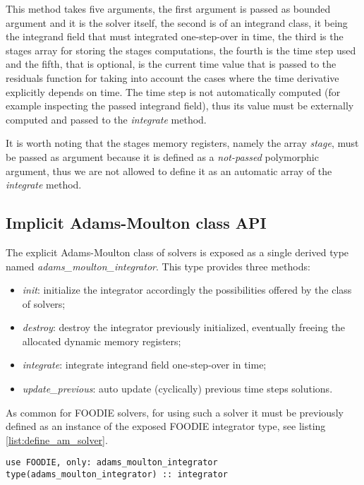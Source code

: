 This method takes five arguments, the first argument is passed as bounded argument and it is the solver itself, the second is of an integrand class, it being the integrand field that must integrated one-step-over in time, the third is the stages array for storing the stages computations, the fourth is the time step used and the fifth, that is optional, is the current time value that is passed to the residuals function for taking into account the cases where the time derivative explicitly depends on time. The time step is not automatically computed (for example inspecting the passed integrand field), thus its value must be externally computed and passed to the \emph{integrate} method.

It is worth noting that the stages memory registers, namely the array \emph{stage}, must be passed as argument because it is defined as a \emph{not-passed} polymorphic argument, thus we are not allowed to define it as an automatic array of the \emph{integrate} method.

\subsection{Implicit Adams-Moulton class API}\label{subsec:solver_am}

The explicit Adams-Moulton class of solvers is exposed as a single derived type named \emph{adams\_moulton\_integrator}. This type provides three methods:

\begin{itemize}
  \item \emph{init}: initialize the integrator accordingly the possibilities offered by the class of solvers;
  \item \emph{destroy}: destroy the integrator previously initialized, eventually freeing the allocated dynamic memory registers;
  \item \emph{integrate}: integrate integrand field one-step-over in time;
  \item \emph{update\_previous}: auto update (cyclically) previous time steps solutions.
  \end{itemize}

As common for FOODIE solvers, for using such a solver it must be previously defined as an instance of the exposed FOODIE integrator type, see listing \ref{list:define_am_solver}.

\begin{lstlisting}[firstnumber=1,style=code,caption={definition of an implicit Adams-Moulton integrator},label={list:define_am_solver}]
use FOODIE, only: adams_moulton_integrator
type(adams_moulton_integrator) :: integrator
\end{lstlisting}

